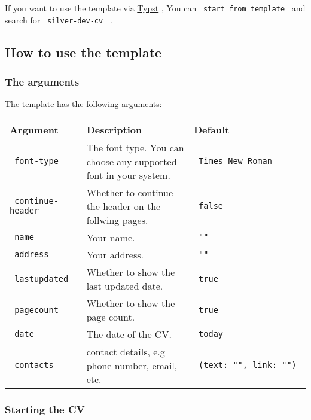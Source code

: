 If you want to use the template via \href{https://typst.app/}{Typst} ,
You can \texttt{\ start\ from\ template\ } and search for
\texttt{\ silver-dev-cv\ } .

\subsection{How to use the template}\label{how-to-use-the-template}

\subsubsection{The arguments}\label{the-arguments}

The template has the following arguments:

\begin{longtable}[]{@{}lll@{}}
\toprule\noalign{}
Argument & Description & Default \\
\midrule\noalign{}
\endhead
\bottomrule\noalign{}
\endlastfoot
\texttt{\ font-type\ } & The font type. You can choose any supported
font in your system. & \texttt{\ Times\ New\ Roman\ } \\
\texttt{\ continue-header\ } & Whether to continue the header on the
follwing pages. & \texttt{\ false\ } \\
\texttt{\ name\ } & Your name. & \texttt{\ ""\ } \\
\texttt{\ address\ } & Your address. & \texttt{\ ""\ } \\
\texttt{\ lastupdated\ } & Whether to show the last updated date. &
\texttt{\ true\ } \\
\texttt{\ pagecount\ } & Whether to show the page count. &
\texttt{\ true\ } \\
\texttt{\ date\ } & The date of the CV. & \texttt{\ today\ } \\
\texttt{\ contacts\ } & contact details, e.g phone number, email, etc. &
\texttt{\ (text:\ "",\ link:\ "")\ } \\
\end{longtable}

\subsubsection{Starting the CV}\label{starting-the-cv}

\begin{Shaded}
\begin{Highlighting}[]

\NormalTok{  )}
\NormalTok{)}
\end{Highlighting}
\end{Shaded}

